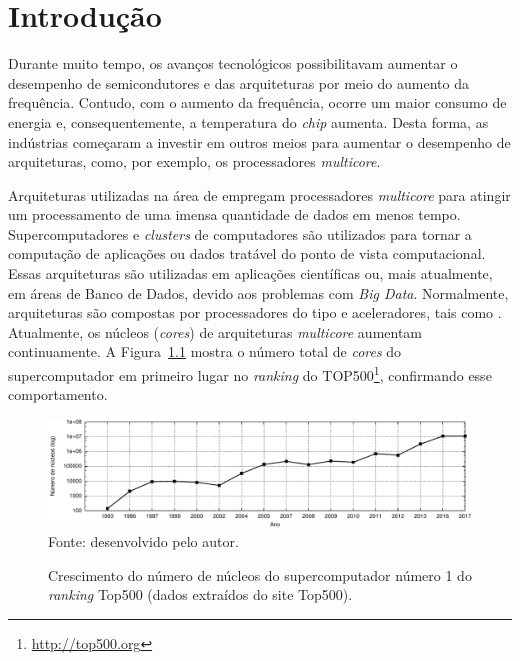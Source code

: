 \chapter{Introdução}
\label{cha:introducao}

Durante muito tempo, os avanços tecnológicos possibilitavam aumentar o
desempenho de semicondutores e das arquiteturas por meio do aumento da
frequência. Contudo, com o aumento da frequência, ocorre um maior consumo de
energia e, consequentemente, a temperatura do \textit{chip} aumenta. Desta
forma, as indústrias começaram a investir em outros meios para aumentar o
desempenho de arquiteturas, como, por exemplo, os processadores \textit{multicore}.

Arquiteturas utilizadas na área de \hpc empregam processadores \textit{multicore} para atingir um
processamento de uma imensa quantidade de dados em menos tempo. Supercomputadores e
\textit{clusters} de computadores são utilizados para tornar a computação de
aplicações ou dados tratável do ponto de vista computacional. Essas arquiteturas
são utilizadas em aplicações científicas ou, mais atualmente, em áreas de Banco
de Dados, devido aos problemas com \textit{Big Data}. Normalmente, arquiteturas
\hpc são compostas por processadores do tipo \cpu{} e aceleradores, tais como \gpu.
Atualmente, os núcleos (\textit{cores}) de arquiteturas \textit{multicore}
aumentam continuamente. A Figura~\ref{fig:graphCores} mostra o número total de
\textit{cores} do supercomputador em primeiro lugar no \textit{ranking} do
TOP500\footnote{\url{http://top500.org}}, confirmando esse comportamento.


\begin{figure}[t]
	\centering
	\caption{Crescimento do número de núcleos do supercomputador número 1 do
        \textit{ranking} Top500 (dados extraídos do site Top500).}
	\includegraphics[width=\textwidth]{figs/top500.pdf} \\
    Fonte: desenvolvido pelo autor.
	\label{fig:graphCores}
\end{figure}

